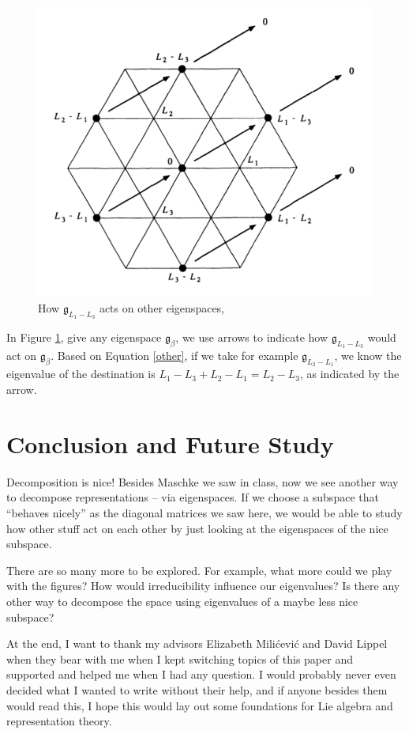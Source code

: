 \documentclass[a4paper]{article}
\theoremstyle{bfnote} %
\theoremstyle{bfnote}                  %
\theoremstyle{example}                       %
\theoremstyle{remark}                       %
\numberwithin{equation}{section}
\begin{document}
\begin{figure}[h!]
 \centering
 \includegraphics[width=4 in]{L1-L3}
 \caption{How $\mathfrak{g}_{L_1-L_3}$ acts on other eigenspaces, \cite{fulton}}
 \label{L1-L3}
 \end{figure}

 In Figure \ref{L1-L3}, give any eigenspace $\mathfrak{g}_{\beta}$, we use arrows to indicate how  $\mathfrak{g}_{L_1-L_3}$ would act on $\mathfrak{g}_\beta$. Based on Equation \ref{other}, if we take for example $\mathfrak{g}_{L_2-L_1}$, we know the eigenvalue of the destination is $L_1-L_3 + L_2 - L_1 = L_2 - L_3$, as indicated by the arrow.

\section{Conclusion and Future Study}

Decomposition is nice! Besides Maschke we saw in class, now we see another way to decompose representations -- via eigenspaces. If we choose a subspace that ``behaves nicely'' as the diagonal matrices we saw here, we would be able to study how other stuff act on each other by just looking at the eigenspaces of the nice subspace.

There are so many more to be explored. For example, what more could we play with the figures? How would irreducibility influence our eigenvalues? Is there any other way to decompose the space using eigenvalues of a maybe less nice subspace? 

At the end, I want to thank my advisors Elizabeth Milićević and David Lippel when they bear with me when I kept switching topics of this paper and supported and helped me when I had any question. I would probably never even decided what I wanted to write without their help, and if anyone besides them would read this, I hope this would lay out some foundations for Lie algebra and representation theory.

\newpage
\printbibliography
\end{document}
